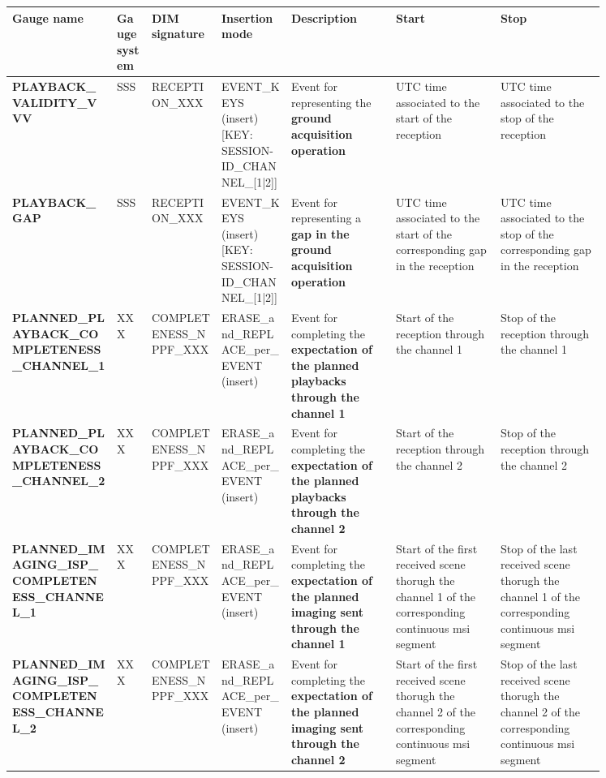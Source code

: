 \begin{landscape}
\begin{longtable}{|M{0.15\linewidth}|M{0.05\linewidth}|M{0.10\linewidth}|M{0.10\linewidth}|M{0.15\linewidth}|M{0.15\linewidth}|M{0.15\linewidth}|}
\hline \textbf{Gauge name} & \textbf{Gauge system} & \textbf{DIM signature} & \textbf{Insertion mode} & \textbf{Description} & \textbf{Start} & \textbf{Stop} \\ \hline
\textbf{PLAYBACK\_VALIDITY\_VVV} & SSS & \- RECEPTION\_XXX & EVENT\_KEYS (insert) [KEY: SESSION-ID\_CHANNEL\_[1|2]] & Event for representing the \textbf{ground acquisition operation} & UTC time associated to the start of the reception & UTC time associated to the stop of the reception \\ \hline
\textbf{PLAYBACK\_GAP} & SSS & \- RECEPTION\_XXX & EVENT\_KEYS (insert) [KEY: SESSION-ID\_CHANNEL\_[1|2]] & Event for representing a \textbf{gap in the ground acquisition operation} & UTC time associated to the start of the corresponding gap in the reception & UTC time associated to the stop of the corresponding gap in the reception \\ \hline
\textbf{PLANNED\_PLAYBACK\_COMPLETENESS\_CHANNEL\_1} & XXX & \- COMPLETENESS\_NPPF\_XXX & ERASE\_and\_REPLACE\_per\_EVENT (insert) & Event for completing the \textbf{expectation of the planned playbacks through the channel 1} & Start of the reception through the channel 1 & Stop of the reception through the channel 1 \\ \hline
\textbf{PLANNED\_PLAYBACK\_COMPLETENESS\_CHANNEL\_2} & XXX & \- COMPLETENESS\_NPPF\_XXX & ERASE\_and\_REPLACE\_per\_EVENT (insert) & Event for completing the \textbf{expectation of the planned playbacks through the channel 2} & Start of the reception through the channel 2 & Stop of the reception through the channel 2 \\ \hline
\textbf{PLANNED\_IMAGING\_ISP\_COMPLETENESS\_CHANNEL\_1} & XXX & \- COMPLETENESS\_NPPF\_XXX & ERASE\_and\_REPLACE\_per\_EVENT (insert) & Event for completing the \textbf{expectation of the planned imaging sent through the channel 1} & Start of the first received scene thorugh the channel 1 of the corresponding continuous \acrshort{msi} segment & Stop of the last received scene thorugh the channel 1 of the corresponding continuous \acrshort{msi} segment \\ \hline
\textbf{PLANNED\_IMAGING\_ISP\_COMPLETENESS\_CHANNEL\_2} & XXX & \- COMPLETENESS\_NPPF\_XXX & ERASE\_and\_REPLACE\_per\_EVENT (insert) & Event for completing the \textbf{expectation of the planned imaging sent through the channel 2} & Start of the first received scene thorugh the channel 2 of the corresponding continuous \acrshort{msi} segment & Stop of the last received scene thorugh the channel 2 of the corresponding continuous \acrshort{msi} segment \\ \hline

\end{longtable}
\end{landscape}
